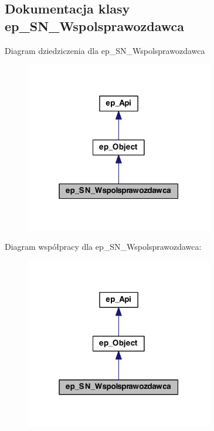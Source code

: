 \hypertarget{classep___s_n___wspolsprawozdawca}{\subsection{Dokumentacja klasy ep\-\_\-\-S\-N\-\_\-\-Wspolsprawozdawca}
\label{classep___s_n___wspolsprawozdawca}
}


Diagram dziedziczenia dla ep\-\_\-\-S\-N\-\_\-\-Wspolsprawozdawca\nopagebreak
\begin{figure}[H]
\begin{center}
\leavevmode
\includegraphics[width=232pt]{classep___s_n___wspolsprawozdawca__inherit__graph}
\end{center}
\end{figure}


Diagram współpracy dla ep\-\_\-\-S\-N\-\_\-\-Wspolsprawozdawca\-:\nopagebreak
\begin{figure}[H]
\begin{center}
\leavevmode
\includegraphics[width=232pt]{classep___s_n___wspolsprawozdawca__coll__graph}
\end{center}
\end{figure}
